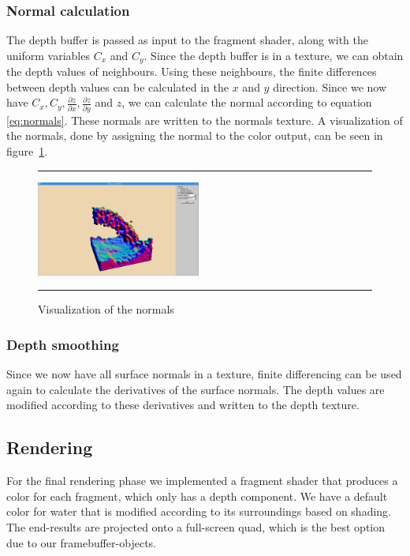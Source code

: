\subsubsection{Normal calculation}
The depth buffer is passed as input to the fragment shader, along with the uniform variables $C_x$ and $C_y$.
Since the depth buffer is in a texture, we can obtain the depth values of neighbours.
Using these neighbours, the finite differences between depth values can be calculated in the $x$ and $y$ direction.
Since we now have $C_x, C_y, \frac{\partial z}{\partial x}, \frac{\partial z}{\partial y}$ and $z$, we can calculate the normal according to equation \ref{eq:normals}.
These normals are written to the normals texture.
A visualization of the normals, done by assigning the normal to the color output, can be seen in figure~\ref{fig:normals}. 

\begin{figure}[!th]
\hrule
\begin{center}
\vspace*{2ex}\includegraphics[width=0.48\textwidth,clip=true,trim=10cm 1cm 10cm 3cm]{pictures/normal_mapping.png}
\end{center}
\caption{Visualization of the normals}
\label{fig:normals} 
\vspace*{2ex}
\hrule
\end{figure}

\subsubsection{Depth smoothing}
Since we now have all surface normals in a texture, finite differencing can be used again to calculate the derivatives of the surface normals.
The depth values are modified according to these derivatives and written to the depth texture.

\subsection{Rendering}
For the final rendering phase we implemented a fragment shader that produces a color for each fragment, which only has a depth component.
We have a default color for water that is modified according to its surroundings based on shading. 
The end-results are projected onto a full-screen quad, which is the best option due to our framebuffer-objects.

